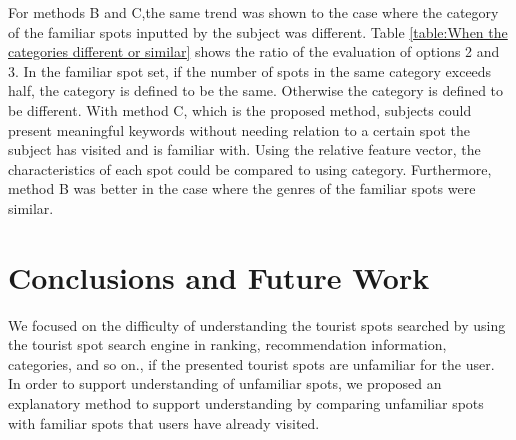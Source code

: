 \documentclass[journal]{IAENGtran}
\begin{document}
For methods B and C,the same trend was shown to the case where the category of the familiar spots inputted by the subject was different.
Table \ref{table:When the categories different or similar} shows the ratio of the evaluation of options 2 and 3.
In the familiar spot set, if the number of spots in the same category exceeds half, the category is defined to be the same.
Otherwise the category is defined to be different.
With method C, which is the proposed method, subjects could present meaningful keywords without needing relation to a certain spot the subject has visited and is familiar with.
Using the relative feature vector, the characteristics of each spot could be compared to using category.
Furthermore, method B was better in the case where the genres of the familiar spots were similar.


\section{Conclusions and Future Work}
\label{sec:Conclusions and Future Work}

We focused on the difficulty of understanding the tourist spots searched by using the tourist spot search engine in ranking, recommendation information, categories, and so on., if the presented tourist spots are unfamiliar for the user.
In order to support understanding of unfamiliar spots, we proposed an explanatory method to support understanding by comparing unfamiliar spots with familiar spots that users have already visited.
\end{document}
